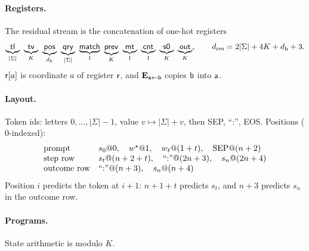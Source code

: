 \paragraph{Registers.} The residual stream is the concatenation of one-hot registers
\[
 \underbrace{\reg{tl}}_{|\Sigma|}\ \underbrace{\reg{tv}}_{K}\ \underbrace{\reg{pos}}_{d_{\mathrm h}}\ \underbrace{\reg{qry}}_{|\Sigma|}\ \underbrace{\reg{match}}_{1}\
 \underbrace{\reg{prev}}_{K}\ \underbrace{\reg{mt}}_{1}\ \underbrace{\reg{cnt}}_{1}\ \underbrace{\reg{s0}}_{K}\ \underbrace{\reg{out}}_{K},
 \qquad d_{\mathrm{res}}=2|\Sigma|+4K+d_{\mathrm h}+3 .
\]
$\mathsf{r}[a]$ is coordinate $a$ of register $\mathsf{r}$, and $\mathbf E_{\mathsf{a}\leftarrow\mathsf{b}}$ copies $\mathsf{b}$ into $\mathsf{a}$.

\paragraph{Layout.} Token ids: letters $0,\ldots,|\Sigma|-1$, value $v\mapsto|\Sigma|+v$, then SEP, ``:'', EOS. Positions ($0$-indexed):
\[
\begin{array}{ll}
 \text{prompt} & s_0@0,\quad w^\star@1,\quad w_t@(1+t),\quad \mathrm{SEP}@(n+2)\\
 \text{step row} & s_t@(n+2+t),\quad ``{:}"@(2n+3),\quad s_n@(2n+4)\\
 \text{outcome row} & ``{:}"@(n+3),\quad s_n@(n+4)
\end{array}
\]
Position $i$ predicts the token at $i+1$: $n+1+t$ predicts $s_t$, and $n+3$ predicts $s_n$ in the outcome row.

\paragraph{Programs.} State arithmetic is modulo $K$.
\begin{center}\small
{}
\end{center}


